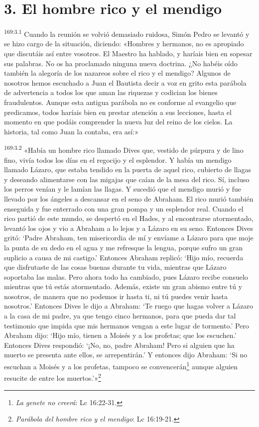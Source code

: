 \section*{3. El hombre rico y el mendigo}
\par
\textsuperscript{169:3.1} Cuando la reunión se volvió demasiado ruidosa, Simón Pedro se levantó y se hizo cargo de la situación, diciendo: «Hombres y hermanos, no es apropiado que discutáis así entre vosotros. El Maestro ha hablado, y haríais bien en sopesar sus palabras. No os ha proclamado ninguna nueva doctrina. ¿No habéis oído también la alegoría de los nazareos sobre el rico y el mendigo? Algunos de nosotros hemos escuchado a Juan el Bautista decir a voz en grito esta parábola de advertencia a todos los que aman las riquezas y codician los bienes fraudulentos. Aunque esta antigua parábola no es conforme al evangelio que predicamos, todos haríais bien en prestar atención a sus lecciones, hasta el momento en que podáis comprender la nueva luz del reino de los cielos. La historia, tal como Juan la contaba, era así:»

\par
\textsuperscript{169:3.2} «Había un hombre rico llamado Dives que, vestido de púrpura y de lino fino, vivía todos los días en el regocijo y el esplendor. Y había un mendigo llamado Lázaro, que estaba tendido en la puerta de aquel rico, cubierto de llagas y deseando alimentarse con las migajas que caían de la mesa del rico. Sí, incluso los perros venían y le lamían las llagas. Y sucedió que el mendigo murió y fue llevado por los ángeles a descansar en el seno de Abraham. El rico murió también enseguida y fue enterrado con una gran pompa y un esplendor real. Cuando el rico partió de este mundo, se despertó en el Hades, y al encontrarse atormentado, levantó los ojos y vio a Abraham a lo lejos y a Lázaro en su seno. Entonces Dives gritó: `Padre Abraham, ten misericordia de mí y envíame a Lázaro para que moje la punta de su dedo en el agua y me refresque la lengua, porque sufro un gran suplicio a causa de mi castigo.' Entonces Abraham replicó: `Hijo mío, recuerda que disfrutaste de las cosas buenas durante tu vida, mientras que Lázaro soportaba las malas. Pero ahora todo ha cambiado, pues Lázaro recibe consuelo mientras que tú estás atormentado. Además, existe un gran abismo entre tú y nosotros, de manera que no podemos ir hasta ti, ni tú puedes venir hasta nosotros.' Entonces Dives le dijo a Abraham: `Te ruego que hagas volver a Lázaro a la casa de mi padre, ya que tengo cinco hermanos, para que pueda dar tal testimonio que impida que mis hermanos vengan a este lugar de tormento.' Pero Abraham dijo: `Hijo mío, tienen a Moisés y a los profetas; que los escuchen.' Entonces Dives respondió: `¡No, no, padre Abraham! Pero si alguien que ha muerto se presenta ante ellos, se arrepentirán.' Y entonces dijo Abraham: `Si no escuchan a Moisés y a los profetas, tampoco se convencerán\footnote{\textit{La genete no creerá}: Lc 16:22-31.} aunque alguien resucite de entre los muertos.'»\footnote{\textit{Parábola del hombre rico y el mendigo}: Lc 16:19-21.}


